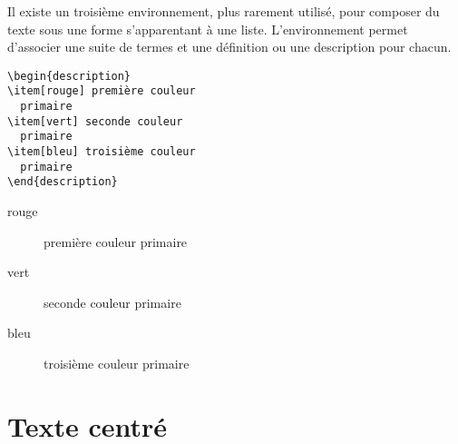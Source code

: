 Il existe un troisième environnement, plus rarement utilisé, pour
composer du texte sous une forme s'apparentant à une liste.
L'environnement  permet d'associer une suite de termes
et une définition ou une description pour chacun.
\begin{demo}
  \begin{texample}
\begin{lstlisting}
\begin{description}
\item[rouge] première couleur
  primaire
\item[vert] seconde couleur
  primaire
\item[bleu] troisième couleur
  primaire
\end{description}
\end{lstlisting}
    \producing
\begin{description}
\item[rouge] première couleur primaire
\item[vert] seconde couleur primaire
\item[bleu] troisième couleur primaire
\end{description}
  \end{texample}
\end{demo}


\section{Texte centré}
\label{sec:apparence:centering}

